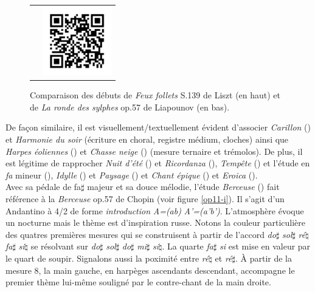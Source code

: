 \begin{figure}[!p]
\begin{bigcenter}
\begin{tabular}{lr}
      &
      \includegraphics[width=3cm, keepaspectratio]{op11-xi-qr.png}
    \end{tabular}
  \end{bigcenter}
  \caption{\label{op11-xi}Comparaison des débuts de \emph{Feux follets} S.139 de Liszt (en haut) et de \emph{La ronde des sylphes} op.57 de Liapounov (en bas).}
\end{figure}

De façon similaire, il est visuellement/textuellement évident d'associer \emph{Carillon} () et \emph{Harmonie du soir} (écriture en choral, registre médium, cloches) ainsi que \emph{Harpes éoliennes} () et \emph{Chasse neige} () (mesure ternaire et trémolos). De plus, il est légitime de rapprocher \emph{Nuit d'été} () et \emph{Ricordanza} (), \emph{Tempête} () et l'étude en \emph{fa} mineur (), \emph{Idylle} () et \emph{Paysage} () et \emph{Chant épique} () et \emph{Eroica} ().\\

Avec sa pédale de fa$\sharp$ majeur et sa douce mélodie, l'étude \emph{Berceuse} () fait référence à la \emph{Berceuse} op.57 de Chopin (voir figure \ref{op11-i}). Il s'agit d'un Andantino à 4/2 de forme \emph{introduction} \emph{A=(ab)} \emph{A'=(a'b')}. L’atmosphère évoque un nocturne mais le thème est d'inspiration russe. Notons la couleur particulière des quatres premières mesures qui se construisent à partir de l'accord \emph{do}$\sharp$ \emph{sol}$\sharp$ \emph{ré}$\natural$ \emph{fa}$\sharp$ \emph{si}$\natural$ se résolvant sur \emph{do}$\sharp$ \emph{sol}$\sharp$ \emph{do}$\sharp$ \emph{mi}$\sharp$ \emph{si}$\natural$. La quarte \emph{fa}$\sharp$ \emph{si} est mise en valeur par le quart de soupir. Signalons aussi la poximité entre \emph{ré}$\natural$ et \emph{ré}$\sharp$. À partir de la mesure 8, la main gauche, en harpèges ascendants descendant, accompagne le premier thème lui-même souligné par le contre-chant de la main droite.

